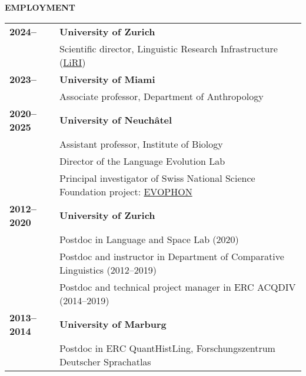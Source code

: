 \documentclass[11pt]{article}
\begin{document}
\vskip 12pt
\begin{flushleft}
{\bf EMPLOYMENT}
\end{flushleft}
\begin{tabular}{lp{5.5in}}

\bf 2024-- & {\bf University of Zurich} \\
& Scientific director, Linguistic Research Infrastructure (\href{https://www.liri.uzh.ch/}{LiRI}) \\

\bf 2023-- & {\bf University of Miami} \\
& Associate professor, Department of Anthropology \\

\bf 2020--2025 & {\bf University of Neuchâtel} \\
& Assistant professor, Institute of Biology \\
& Director of the Language Evolution Lab \\
& Principal investigator of Swiss National Science Foundation project: \href{https://data.snf.ch/grants/grant/186841}{EVOPHON} \\


\bf 2012--2020 & {\bf University of Zurich} \\

& Postdoc in Language and Space Lab (2020) \\
& Postdoc and instructor in Department of Comparative Linguistics (2012--2019) \\
& Postdoc and technical project manager in ERC ACQDIV (2014--2019) \\

\bf 2013--2014 & {\bf University of Marburg} \\
& Postdoc in ERC QuantHistLing, Forschungszentrum Deutscher Sprachatlas \\


\end{tabular}
\end{document}
